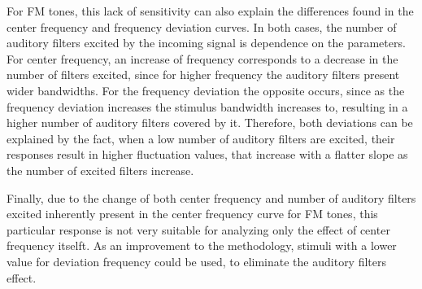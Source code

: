 \documentclass[../main.tex]{subfiles}
\begin{document}
For \gls{FM} tones, this lack of sensitivity can also explain the differences
found in the center frequency and frequency deviation curves. In both cases,
the number of auditory filters excited by the incoming signal is dependence on
the parameters. For center frequency, an increase of frequency corresponds to a
decrease in the number of filters excited, since for higher frequency the
auditory filters present wider bandwidths. For the frequency deviation the
opposite occurs, since as the frequency deviation increases the stimulus
bandwidth increases to, resulting in a higher number of auditory filters covered
by it. Therefore, both deviations can be explained by the fact, when a low
number of auditory filters are excited, their responses result in higher
fluctuation values, that increase with a flatter slope as the number of excited
filters increase.

Finally, due to the change of both center frequency and number of auditory
filters excited inherently present in the center frequency curve for \gls{FM}
tones, this particular response is not very suitable for analyzing only the
effect of center frequency itselft. As an improvement to the methodology,
stimuli with a lower value for deviation frequency could be used, to eliminate
the auditory filters effect.
\end{document}
